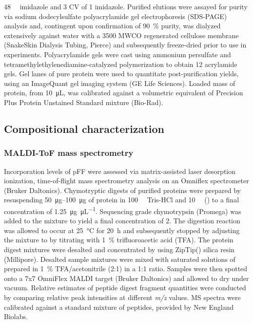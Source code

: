 \begin{refsection}
\SI{48}{\milli\moLar} imidazole and 3 CV of \SI{1}{\moLar} imidazole.  Purified
elutions were assayed for purity via sodium dodecylsulfate polyacrylamide gel
electrophoresis (SDS-PAGE) analysis and, contingent upon confirmation of
\SI{90}{\percent} purity, was dialyzed extensively against water with a 3500
MWCO regenerated cellulose membrane (SnakeSkin Dialysis Tubing, Pierce) and
subsequently freeze-dried prior to use in experiments. Polyacrylamide gels were
cast using ammonium persulfate and tetramethylethylenediamine-catalyzed
polymerization to obtain \SI{12}{\wtper} acrylamide gels. Gel lanes of pure
protein were used to quantitate post-purification yields, using an ImageQuant
gel imaging system (GE Life Sciences). Loaded mass of protein, from
\SI{10}{\uL}, was calibrated against a volumetric equivalent of Precision Plus
Protein Unstained Standard mixture (Bio-Rad).

\subsection{Compositional characterization}
\subsubsection{MALDI-ToF mass spectrometry}

Incorporation levels of pFF were assessed via matrix-assisted laser desorption
ionization, time-of-flight mass spectrometry analysis on an Omniflex
spectrometer (Bruker Daltonics). Chymotryptic digests of purified proteins were
prepared by resuspending \SIrange[range-phrase=--]{50}{100}{\ug} of protein in
\SI{100}{\milli\moLar} Tris-HCl and \SI{10}{\milli\moLar}  ()
to a final concentration of \SI{1.25}{\ug\per\uL}. Sequencing grade chymotrypsin
(Promega) was added to the mixture to yield a final concentration of
\SI{2}{\wtperwt}. The digestion reaction was allowed to occur at \SI{25}{\celsius}
for \SI{20}{\hour} and subsequently stopped by adjusting the mixture to  by
titrating with \SI{1}{\percent} trifluoroacetic acid (TFA). The protein digest
mixtures were desalted and concentrated by using ZipTip() silica resin
(Millipore).  Desalted sample mixtures were mixed with saturated solutions of
 prepared in \SI{1}{\percent}
TFA/acetonitrile (2:1) in a 1:1 ratio. Samples were then spotted onto a 7x7
OmniFlex MALDI target (Bruker Daltonics) and allowed to dry under vacuum.
Relative estimates of peptide digest fragment quantities were conducted by
comparing relative peak intensities at different \emph{m/z} values. MS spectra
were calibrated against a standard mixture of peptides, provided by New England
Biolabs.


\end{refsection}
